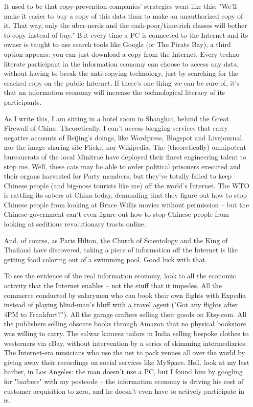 It used to be that copy-prevention companies' strategies went like
this: "We'll make it easier to buy a copy of this data than to make
an unauthorized copy of it. That way, only the uber-nerds and the
cash-poor/time-rich classes will bother to copy instead of buy."
But every time a PC is connected to the Internet and its owner is
taught to use search tools like Google (or The Pirate Bay), a third
option appears: you can just download a copy from the Internet.
Every techno-literate participant in the information economy can
choose to access any data, without having to break the anti-copying
technology, just by searching for the cracked copy on the public
Internet. If there's one thing we can be sure of, it's that an
information economy will increase the technological literacy of its
participants.

As I write this, I am sitting in a hotel room in Shanghai, behind
the Great Firewall of China. Theoretically, I can't access blogging
services that carry negative accounts of Beijing's doings, like
Wordpress, Blogspot and Livejournal, nor the image-sharing site
Flickr, nor Wikipedia. The (theoretically) omnipotent bureaucrats
of the local Minitrue have deployed their finest engineering talent
to stop me. Well, these cats may be able to order political
prisoners executed and their organs harvested for Party members,
but they've totally failed to keep Chinese people (and big-nose
tourists like me) off the world's Internet. The WTO is rattling its
sabers at China today, demanding that they figure out how to stop
Chinese people from looking at Bruce Willis movies without
permission -- but the Chinese government can't even figure out how
to stop Chinese people from looking at seditious revolutionary
tracts online.

And, of course, as Paris Hilton, the Church of Scientology and the
King of Thailand have discovered, taking a piece of information off
the Internet is like getting food coloring out of a swimming pool.
Good luck with that.

To see the evidence of the real information economy, look to all
the economic activity that the Internet enables -- not the stuff
that it impedes. All the commerce conducted by salarymen who can
book their own flights with Expedia instead of playing blind-man's
bluff with a travel agent ("Got any flights after 4PM to
Frankfurt?"). All the garage crafters selling their goods on
Etsy.com. All the publishers selling obscure books through Amazon
that no physical bookstore was willing to carry. The salwar kameez
tailors in India selling bespoke clothes to westerners via eBay,
without intervention by a series of skimming intermediaries. The
Internet-era musicians who use the net to pack venues all over the
world by giving away their recordings on social services like
MySpace. Hell, look at my last barber, in Los Angeles: the man
doesn't use a PC, but I found him by googling for "barbers" with my
postcode -- the information economy is driving his cost of customer
acquisition to zero, and he doesn't even have to actively
participate in it.

